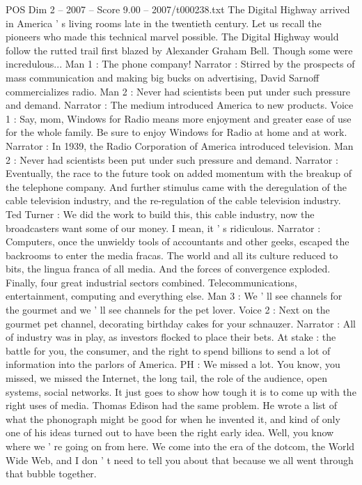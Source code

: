 \begin{textsample}{POS Dim 2 – 2007 – Score 9.00 – 2007/t000238.txt}
The Digital Highway arrived in America ' s living rooms late in the twentieth century.
Let us recall the pioneers who made this technical marvel possible.
The Digital Highway would follow the rutted trail first blazed by Alexander Graham Bell.
Though some were incredulous...
Man 1 : The phone company!
Narrator : Stirred by the prospects of mass communication and making big bucks on advertising, David Sarnoff commercializes radio.
Man 2 : Never had scientists been put under such pressure and demand.
Narrator : The medium introduced America to new products.
Voice 1 : Say, mom, Windows for Radio means more enjoyment and greater ease of use for the whole family.
Be sure to enjoy Windows for Radio at home and at work.
Narrator : In 1939, the Radio Corporation of America introduced television.
Man 2 : Never had scientists been put under such pressure and demand.
Narrator : Eventually, the race to the future took on added momentum with the breakup of the telephone company.
And further stimulus came with the deregulation of the cable television industry, and the re-regulation of the cable television industry.
Ted Turner : We did the work to build this, this cable industry, now the broadcasters want some of our money.
I mean, it ' s ridiculous.
Narrator : Computers, once the unwieldy tools of accountants and other geeks, escaped the backrooms to enter the media fracas.
The world and all its culture reduced to bits, the lingua franca of all media.
And the forces of convergence exploded.
Finally, four great industrial sectors combined.
Telecommunications, entertainment, computing and everything else.
Man 3 : We ' ll see channels for the gourmet and we ' ll see channels for the pet lover.
Voice 2 : Next on the gourmet pet channel, decorating birthday cakes for your schnauzer.
Narrator : All of industry was in play, as investors flocked to place their bets.
At stake : the battle for you, the consumer, and the right to spend billions to send a lot of information into the parlors of America.
PH : We missed a lot.
You know, you missed, we missed the Internet, the long tail, the role of the audience, open systems, social networks.
It just goes to show how tough it is to come up with the right uses of media.
Thomas Edison had the same problem.
He wrote a list of what the phonograph might be good for when he invented it, and kind of only one of his ideas turned out to have been the right early idea.
Well, you know where we ' re going on from here.
We come into the era of the dotcom, the World Wide Web, and I don ' t need to tell you about that because we all went through that bubble together.

\end{textsample}
